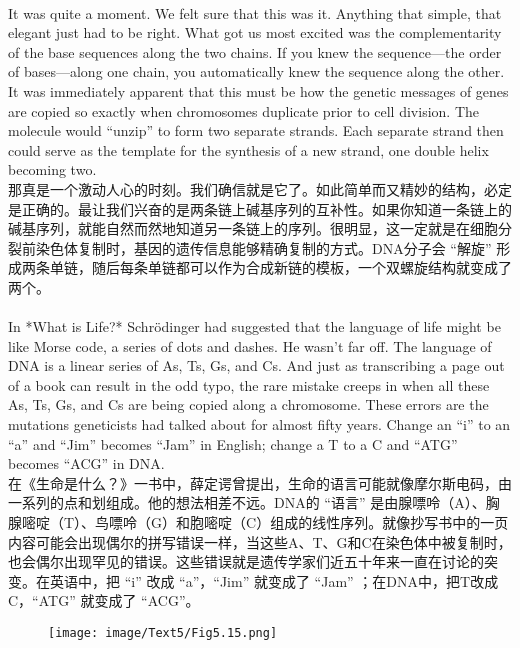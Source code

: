 \documentclass{article}
\begin{document}
\\
It was quite a moment. We felt sure that this was it. Anything that simple, that elegant just had to be right. What got us most excited was the complementarity of the base sequences along the two chains. If you knew the sequence—the order of bases—along one chain, you automatically knew the sequence along the other. It was immediately apparent that this must be how the genetic messages of genes are copied so exactly when chromosomes duplicate prior to cell division. The molecule would “unzip” to form two separate strands. Each separate strand then could serve as the template for the synthesis of a new strand, one double helix becoming two.\\
那真是一个激动人心的时刻。我们确信就是它了。如此简单而又精妙的结构，必定是正确的。最让我们兴奋的是两条链上碱基序列的互补性。如果你知道一条链上的碱基序列，就能自然而然地知道另一条链上的序列。很明显，这一定就是在细胞分裂前染色体复制时，基因的遗传信息能够精确复制的方式。DNA分子会 “解旋” 形成两条单链，随后每条单链都可以作为合成新链的模板，一个双螺旋结构就变成了两个。 \\

\\
In *What is Life?* Schrödinger had suggested that the language of life might be like Morse code, a series of dots and dashes. He wasn’t far off. The language of DNA is a linear series of As, Ts, Gs, and Cs. And just as transcribing a page out of a book can result in the odd typo, the rare mistake creeps in when all these As, Ts, Gs, and Cs are being copied along a chromosome. These errors are the mutations geneticists had talked about for almost fifty years. Change an “i” to an “a” and “Jim” becomes “Jam” in English; change a T to a C and “ATG” becomes “ACG” in DNA.\\
在《生命是什么？》一书中，薛定谔曾提出，生命的语言可能就像摩尔斯电码，由一系列的点和划组成。他的想法相差不远。DNA的 “语言” 是由腺嘌呤（A）、胸腺嘧啶（T）、鸟嘌呤（G）和胞嘧啶（C）组成的线性序列。就像抄写书中的一页内容可能会出现偶尔的拼写错误一样，当这些A、T、G和C在染色体中被复制时，也会偶尔出现罕见的错误。这些错误就是遗传学家们近五十年来一直在讨论的突变。在英语中，把 “i” 改成 “a”，“Jim” 就变成了 “Jam” ；在DNA中，把T改成C，“ATG” 就变成了 “ACG”。 \\

\begin{figure}
    \centering
    \texttt{[image: image/Text5/Fig5.15.png]}
\end{figure}
\end{document}
